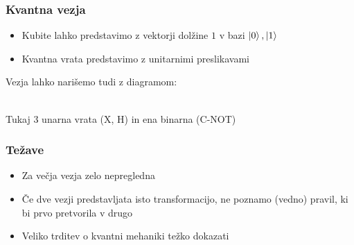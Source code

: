 \documentclass[10pt]{beamer}
\begin{document}
\begin{frame}[fragile]
  \frametitle{Kvantna vezja}
  \begin{itemize}
  \item Kubite lahko predstavimo z vektorji dolžine \(1\) v bazi \(\ket0, \ket1\)
  \item Kvantna vrata predstavimo z unitarnimi preslikavami
  \end{itemize}
  Vezja lahko narišemo tudi z diagramom:\\
  \\
  Tukaj 3 unarna vrata (X, H) in ena binarna (C-NOT)
\end{frame}
\begin{frame}
  \frametitle{Težave}
  \pause
  \begin{itemize}
  \item Za večja vezja zelo nepregledna \pause
  \item Če dve vezji predstavljata isto transformacijo, ne poznamo (vedno) pravil, ki bi prvo pretvorila v drugo\pause
  \item Veliko trditev o kvantni mehaniki težko dokazati
  \end{itemize}
\end{frame}
\end{document}
